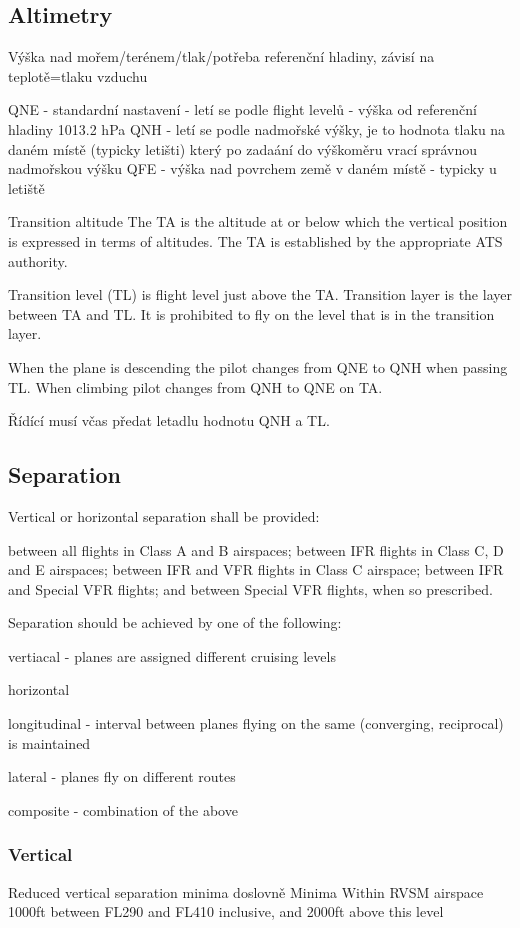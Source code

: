 \subsection{Altimetry}
Výška nad mořem/terénem/tlak/potřeba referenční hladiny, závisí na teplotě=tlaku vzduchu

QNE - standardní nastavení - letí se podle flight levelů - výška od referenční hladiny 1013.2 hPa
QNH - letí se podle nadmořské výšky, je to hodnota tlaku na daném místě (typicky letišti) který po zadaání do výškoměru vrací správnou nadmořskou výšku
QFE - výška nad povrchem země v daném místě - typicky u letiště


Transition altitude
The TA is the altitude at or below which the vertical position is expressed in terms of altitudes. The TA is established by the appropriate ATS authority.

Transition level (TL) is flight level just above the TA. Transition layer is the layer between TA and TL. It is prohibited to fly on the level that is in the transition layer.

When the plane is descending the pilot changes from QNE to QNH when passing TL. When climbing pilot changes from QNH to QNE on TA.

Řídící musí včas předat letadlu hodnotu QNH a TL.

\subsection{Separation}
Vertical or horizontal separation shall be provided:

between all flights in Class A and B airspaces;
between IFR flights in Class C, D and E airspaces;
between IFR and VFR flights in Class C airspace;
between IFR and Special VFR flights; and
between Special VFR flights, when so prescribed.
\cite[Chapter 5.2]{doc4444}

Separation should be achieved by one of the following:
\bitem
\item vertiacal - planes are assigned different cruising levels
\item horizontal
	\bitem
	\item longitudinal - interval between planes flying on the same (converging, reciprocal) is maintained
	\item lateral - planes fly on different routes
	\eitem
\item composite - combination of the above
\eitem
\cite[Chapter 3.3]{doc4444}

\subsubsection{Vertical}
Reduced vertical separation minima
doslovně
Minima
Within RVSM airspace 
1000ft between FL290 and FL410 inclusive, and
2000ft above this level

